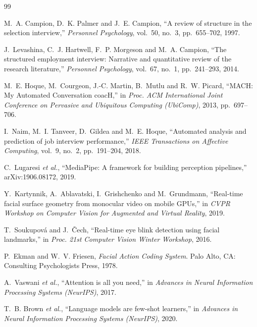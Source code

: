 \documentclass[12pt,a4paper,oneside]{report}
\begin{document}
\begin{thebibliography}{99}

 M.~A. Campion, D.~K. Palmer and J.~E. Campion, ``A review of structure in the selection interview,'' \emph{Personnel Psychology}, vol.~50, no.~3, pp.~655--702, 1997.

 J.~Levashina, C.~J. Hartwell, F.~P. Morgeson and M.~A. Campion, ``The structured employment interview: Narrative and quantitative review of the research literature,'' \emph{Personnel Psychology}, vol.~67, no.~1, pp.~241--293, 2014.

 M.~E. Hoque, M.~Courgeon, J.-C. Martin, B.~Mutlu and R.~W. Picard, ``MACH: My Automated Conversation coacH,'' in \emph{Proc. ACM International Joint Conference on Pervasive and Ubiquitous Computing (UbiComp)}, 2013, pp.~697--706.

 I.~Naim, M.~I. Tanveer, D.~Gildea and M.~E. Hoque, ``Automated analysis and prediction of job interview performance,'' \emph{IEEE Transactions on Affective Computing}, vol.~9, no.~2, pp.~191--204, 2018.

 C.~Lugaresi \emph{et al.}, ``MediaPipe: A framework for building perception pipelines,'' arXiv:1906.08172, 2019.

 Y.~Kartynnik, A.~Ablavatski, I.~Grishchenko and M.~Grundmann, ``Real-time facial surface geometry from monocular video on mobile GPUs,'' in \emph{CVPR Workshop on Computer Vision for Augmented and Virtual Reality}, 2019.

 T.~Soukupov\'{a} and J.~\v{C}ech, ``Real-time eye blink detection using facial landmarks,'' in \emph{Proc. 21st Computer Vision Winter Workshop}, 2016.

 P.~Ekman and W.~V. Friesen, \emph{Facial Action Coding System}. Palo Alto, CA: Consulting Psychologists Press, 1978.

 A.~Vaswani \emph{et al.}, ``Attention is all you need,'' in \emph{Advances in Neural Information Processing Systems (NeurIPS)}, 2017.

 T.~B. Brown \emph{et al.}, ``Language models are few-shot learners,'' in \emph{Advances in Neural Information Processing Systems (NeurIPS)}, 2020.


\end{thebibliography}
\end{document}
